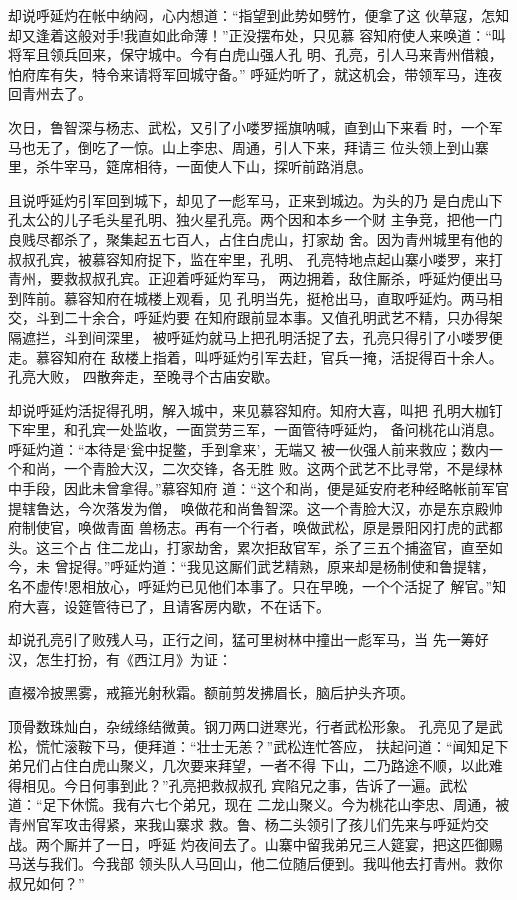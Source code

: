 却说呼延灼在帐中纳闷，心内想道：“指望到此势如劈竹，便拿了这
伙草寇，怎知却又逢着这般对手!我直如此命薄！”正没摆布处，只见慕
容知府使人来唤道：“叫将军且领兵回来，保守城中。今有白虎山强人孔
明、孔亮，引人马来青州借粮，怕府库有失，特令来请将军回城守备。”
呼延灼听了，就这机会，带领军马，连夜回青州去了。

次日，鲁智深与杨志、武松，又引了小喽罗摇旗呐喊，直到山下来看
时，一个军马也无了，倒吃了一惊。山上李忠、周通，引人下来，拜请三
位头领上到山寨里，杀牛宰马，筵席相待，一面使人下山，探听前路消息。

且说呼延灼引军回到城下，却见了一彪军马，正来到城边。为头的乃
是白虎山下孔太公的儿子毛头星孔明、独火星孔亮。两个因和本乡一个财
主争竞，把他一门良贱尽都杀了，聚集起五七百人，占住白虎山，打家劫
舍。因为青州城里有他的叔叔孔宾，被慕容知府捉下，监在牢里，孔明、
孔亮特地点起山寨小喽罗，来打青州，要救叔叔孔宾。正迎着呼延灼军马，
两边拥着，敌住厮杀，呼延灼便出马到阵前。慕容知府在城楼上观看，见
孔明当先，挺枪出马，直取呼延灼。两马相交，斗到二十余合，呼延灼要
在知府跟前显本事。又值孔明武艺不精，只办得架隔遮拦，斗到间深里，
被呼延灼就马上把孔明活捉了去，孔亮只得引了小喽罗便走。慕容知府在
敌楼上指着，叫呼延灼引军去赶，官兵一掩，活捉得百十余人。孔亮大败，
四散奔走，至晚寻个古庙安歇。

却说呼延灼活捉得孔明，解入城中，来见慕容知府。知府大喜，叫把
孔明大枷钉下牢里，和孔宾一处监收，一面赏劳三军，一面管待呼延灼，
备问桃花山消息。呼延灼道：“本待是‘瓮中捉鳖，手到拿来’，无端又
被一伙强人前来救应；数内一个和尚，一个青脸大汉，二次交锋，各无胜
败。这两个武艺不比寻常，不是绿林中手段，因此未曾拿得。”慕容知府
道：“这个和尚，便是延安府老种经略帐前军官提辖鲁达，今次落发为僧，
唤做花和尚鲁智深。这一个青脸大汉，亦是东京殿帅府制使官，唤做青面
兽杨志。再有一个行者，唤做武松，原是景阳冈打虎的武都头。这三个占
住二龙山，打家劫舍，累次拒敌官军，杀了三五个捕盗官，直至如今，未
曾捉得。”呼延灼道：“我见这厮们武艺精熟，原来却是杨制使和鲁提辖，
名不虚传!恩相放心，呼延灼已见他们本事了。只在早晚，一个个活捉了
解官。”知府大喜，设筵管待已了，且请客房内歇，不在话下。

却说孔亮引了败残人马，正行之间，猛可里树林中撞出一彪军马，当
先一筹好汉，怎生打扮，有《西江月》为证：

直裰冷披黑雾，戒箍光射秋霜。额前剪发拂眉长，脑后护头齐项。

顶骨数珠灿白，杂绒绦结微黄。钢刀两口迸寒光，行者武松形象。
孔亮见了是武松，慌忙滚鞍下马，便拜道：“壮士无恙？”武松连忙答应，
扶起问道：“闻知足下弟兄们占住白虎山聚义，几次要来拜望，一者不得
下山，二乃路途不顺，以此难得相见。今日何事到此？”孔亮把救叔叔孔
宾陷兄之事，告诉了一遍。武松道：“足下休慌。我有六七个弟兄，现在
二龙山聚义。今为桃花山李忠、周通，被青州官军攻击得紧，来我山寨求
救。鲁、杨二头领引了孩儿们先来与呼延灼交战。两个厮并了一日，呼延
灼夜间去了。山寨中留我弟兄三人筵宴，把这匹御赐马送与我们。今我部
领头队人马回山，他二位随后便到。我叫他去打青州。救你叔兄如何？”

